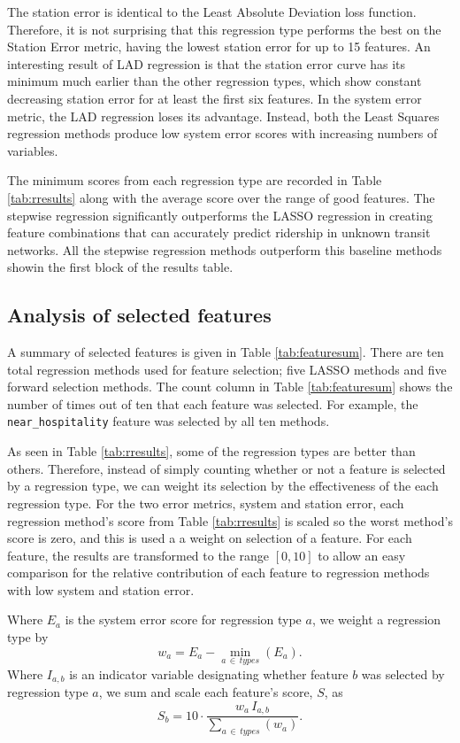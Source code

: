 \documentclass[11pt]{article}
\begin{document}
The station error is identical to the Least Absolute Deviation loss function. Therefore, it is not surprising that this regression type performs the best on the Station Error metric, having the lowest station error for up to 15 features. An interesting result of LAD regression is that the station error curve has its minimum much earlier than the other regression types, which show constant decreasing station error for at least the first six features. In the system error metric, the LAD regression loses its advantage. Instead, both the Least Squares regression methods produce low system error scores with increasing numbers of variables. 

The minimum scores from each regression type are recorded in Table \ref{tab:rresults} along with the average score over the range of good features. The stepwise regression significantly outperforms the LASSO regression in creating feature combinations that can accurately predict ridership in unknown transit networks. All the stepwise regression methods outperform this baseline methods showin the first block of the results table. 

\subsection{Analysis of selected features}

A summary of selected features is given in Table \ref{tab:featuresum}. There are ten total regression methods used for feature selection; five LASSO methods and five forward selection methods. The count column in Table \ref{tab:featuresum} shows the number of times out of ten that each feature was selected. For example, the \texttt{near\_hospitality} feature was selected by all ten methods.

As seen in Table \ref{tab:rresults}, some of the regression types are better than others. Therefore, instead of simply counting whether or not a feature is selected by a regression type, we can weight its selection by the effectiveness of the each regression type. For the two error metrics, system and station error, each regression method's score from Table \ref{tab:rresults} is scaled so the worst method's score is zero, and this is used a a weight on selection of a feature. For each feature, the results are transformed to the range $[0, 10]$ to allow an easy comparison for the relative contribution of each feature to regression methods with low system and station error.

Where $E_{a}$ is the system error score for regression type $a$, we weight a regression type by
\[ w_a = E_{a} - \min\limits_{a\,\in\,types}(E_a).\]
Where $I_{a, b}$ is an indicator variable designating whether feature $b$ was selected by regression type $a$, we sum and scale each feature's score, $S$, as
\[S_b = 10\cdot \frac{w_a\,I_{a, b}}{\sum\limits_{a\,\in\,types}(w_a)}.\]
\end{document}
